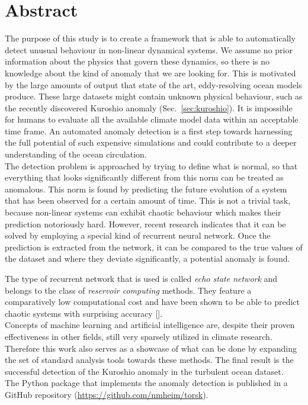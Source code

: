 \section*{Abstract}%
\label{sec:abstract}

The purpose of this study is to create a framework that is able to
automatically detect unusual behaviour in non-linear dynamical systems.  We
assume no prior information about the physics that govern these dynamics, so
there is no knowledge about the kind of anomaly that we are looking for.  This
is motivated by the large amounts of output that state of the art,
eddy-resolving ocean models produce.  These large datasets might contain
unknown physical behaviour, such as the recently discovered Kuroshio anomaly
(Sec.~\ref{sec:kuroshio}).  It is impossible for humans to evaluate all the
available climate model data within an acceptable time frame. An automated
anomaly detection is a first step towards harnessing the full potential of such
expensive simulations and could contribute to a deeper understanding of the
ocean circulation.\\

The detection problem is approached by trying to define what is normal, so that
everything that looks significantly different from this norm can be treated as
anomalous. This norm is found by predicting the future evolution of a system
that has been observed for a certain amount of time.  This is not a trivial
task, because non-linear systems can exhibit chaotic behaviour which makes
their prediction notoriously hard. However, recent research indicates that it
can be solved by employing a special kind of recurrent neural network. Once the
prediction is extracted from the network, it can be compared to the true values
of the dataset and where they deviate significantly, a potential anomaly is
found.

The type of recurrent network that is used is called \emph{echo state network}
and belongs to the class of \emph{reservoir computing} methods.  They feature a
comparatively low computational cost and have been shown to be able to predict
chaotic systems with surprising accuracy [\cite{pathak2018model}].\\

Concepts of machine learning and artificial intelligence are, despite their
proven effectiveness in other fields, still very sparsely utilized in climate
research.  Therefore this work also serves as a showcase of what can be done by
expanding the set of standard analysis tools towards these methods.  The final
result is the successful detection of the Kuroshio anomaly in the turbulent
ocean dataset.\\

The Python package that implements the anomaly detection is published in a GitHub
repository (\url{https://github.com/nmheim/torsk}).
